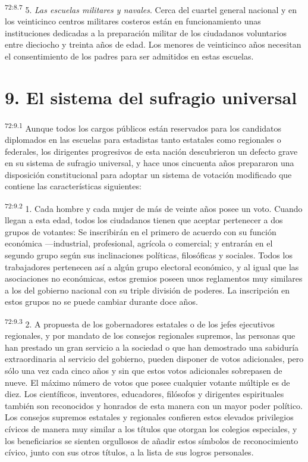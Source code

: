 \par
\textsuperscript{72:8.7} 5. \textit{Las escuelas militares y navales}. Cerca del cuartel general nacional y en los veinticinco centros militares costeros están en funcionamiento unas instituciones dedicadas a la preparación militar de los ciudadanos voluntarios entre dieciocho y treinta años de edad. Los menores de veinticinco años necesitan el consentimiento de los padres para ser admitidos en estas escuelas.

\section*{9. El sistema del sufragio universal}
\par
\textsuperscript{72:9.1} Aunque todos los cargos públicos están reservados para los candidatos diplomados en las escuelas para estadistas tanto estatales como regionales o federales, los dirigentes progresivos de esta nación descubrieron un defecto grave en su sistema de sufragio universal, y hace unos cincuenta años prepararon una disposición constitucional para adoptar un sistema de votación modificado que contiene las características siguientes:

\par
\textsuperscript{72:9.2} 1. Cada hombre y cada mujer de más de veinte años posee un voto. Cuando llegan a esta edad, todos los ciudadanos tienen que aceptar pertenecer a dos grupos de votantes: Se inscribirán en el primero de acuerdo con su función económica ---industrial, profesional, agrícola o comercial; y entrarán en el segundo grupo según sus inclinaciones políticas, filosóficas y sociales. Todos los trabajadores pertenecen así a algún grupo electoral económico, y al igual que las asociaciones no económicas, estos gremios poseen unos reglamentos muy similares a los del gobierno nacional con su triple división de poderes. La inscripción en estos grupos no se puede cambiar durante doce años.

\par
\textsuperscript{72:9.3} 2. A propuesta de los gobernadores estatales o de los jefes ejecutivos regionales, y por mandato de los consejos regionales supremos, las personas que han prestado un gran servicio a la sociedad o que han demostrado una sabiduría extraordinaria al servicio del gobierno, pueden disponer de votos adicionales, pero sólo una vez cada cinco años y sin que estos votos adicionales sobrepasen de nueve. El máximo número de votos que posee cualquier votante múltiple es de diez. Los científicos, inventores, educadores, filósofos y dirigentes espirituales también son reconocidos y honrados de esta manera con un mayor poder político. Los consejos supremos estatales y regionales confieren estos elevados privilegios cívicos de manera muy similar a los títulos que otorgan los colegios especiales, y los beneficiarios se sienten orgullosos de añadir estos símbolos de reconocimiento cívico, junto con sus otros títulos, a la lista de sus logros personales.

